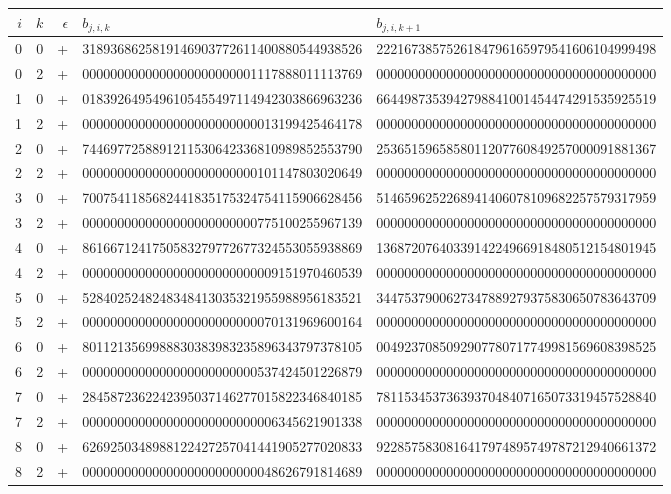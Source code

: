 \begin{longtable}{rrrll}
$i$ & $k$ & $\epsilon$ & $b_{j,i,k}$ & $b_{j,i,k+1}$ \\ \hline\endhead
0 & 0 & + & 3189368625819146903772611400880544938526 & 2221673857526184796165979541606104999498 \\
0 & 2 & + & 0000000000000000000000001117888011113769 & 0000000000000000000000000000000000000000 \\
1 & 0 & + & 0183926495496105455497114942303866963236 & 6644987353942798841001454474291535925519 \\
1 & 2 & + & 0000000000000000000000000013199425464178 & 0000000000000000000000000000000000000000 \\
2 & 0 & + & 7446977258891211530642336810989852553790 & 2536515965858011207760849257000091881367 \\
2 & 2 & + & 0000000000000000000000000101147803020649 & 0000000000000000000000000000000000000000 \\
3 & 0 & + & 7007541185682441835175324754115906628456 & 5146596252268941406078109682257579317959 \\
3 & 2 & + & 0000000000000000000000000775100255967139 & 0000000000000000000000000000000000000000 \\
4 & 0 & + & 8616671241750583279772677324553055938869 & 1368720764033914224966918480512154801945 \\
4 & 2 & + & 0000000000000000000000000009151970460539 & 0000000000000000000000000000000000000000 \\
5 & 0 & + & 5284025248248348413035321955988956183521 & 3447537900627347889279375830650783643709 \\
5 & 2 & + & 0000000000000000000000000070131969600164 & 0000000000000000000000000000000000000000 \\
6 & 0 & + & 8011213569988830383983235896343797378105 & 0049237085092907780717749981569608398525 \\
6 & 2 & + & 0000000000000000000000000537424501226879 & 0000000000000000000000000000000000000000 \\
7 & 0 & + & 2845872362242395037146277015822346840185 & 7811534537363937048407165073319457528840 \\
7 & 2 & + & 0000000000000000000000000006345621901338 & 0000000000000000000000000000000000000000 \\
8 & 0 & + & 6269250348988122427257041441905277020833 & 9228575830816417974895749787212940661372 \\
8 & 2 & + & 0000000000000000000000000048626791814689 & 0000000000000000000000000000000000000000 \\
\end{longtable}
